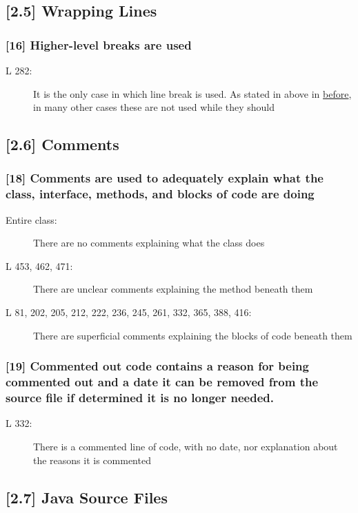 \subsection*{[2.5] Wrapping Lines}
\subsubsection*{[16] Higher-level breaks are used}
\begin{description}
	\item[L 282:] It is the only case in which line break is used. As stated in above in \hyperref[subsec:lineLen]{before}, in many other cases these are not used while they should
\end{description}

\subsection*{[2.6] Comments}
\subsubsection*{[18] Comments are used to adequately explain what the class, interface, methods, and blocks of code are doing}
\begin{description}
	\item[Entire class:] There are no comments explaining what the class does
	\item[L 453, 462, 471:] There are unclear comments explaining the method beneath them
	\item[L 81, 202, 205, 212, 222, 236, 245, 261, 332, 365, 388, 416:] There are superficial comments explaining the blocks of code beneath them 
\end{description}

\subsubsection*{[19] Commented out code contains a reason for being commented out and a date it can be removed from the source file if determined it is no longer needed.}
\begin{description}
	\item[L 332:] There is a commented line of code, with no date, nor explanation about the reasons it is commented
\end{description}

\subsection*{[2.7] Java Source Files}

